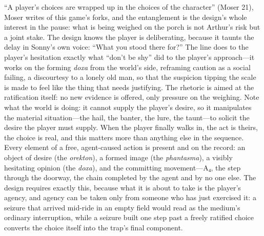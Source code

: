 \documentclass{article}
\begin{document}
``A player's choices are wrapped up in the choices of the character'' (Moser 21), Moser writes of this game's forks, and the entanglement is the design's whole interest in the pause: what is being weighed on the porch is not Arthur's risk but a joint stake. The design knows the player is deliberating, because it taunts the delay in Sonny's own voice: ``What you stood there for?'' The line does to the player's hesitation exactly what ``don't be shy'' did to the player's approach---it works on the forming \textit{doxa} from the world's side, reframing caution as a social failing, a discourtesy to a lonely old man, so that the suspicion tipping the scale is made to feel like the thing that needs justifying. The rhetoric is aimed at the ratification itself: no new evidence is offered, only pressure on the weighing. Note what the world is doing: it cannot supply the player's desire, so it manipulates the material situation---the hail, the banter, the lure, the taunt---to solicit the desire the player must supply. When the player finally walks in, the act is theirs, the choice is real, and this matters more than anything else in the sequence. Every element of a free, agent-caused action is present and on the record: an object of desire (the \textit{orekton}), a formed image (the \textit{phantasma}), a visibly hesitating opinion (the \textit{doxa}), and the committing movement---A₄, the step through the doorway, the chain completed by the agent and by no one else. The design requires exactly this, because what it is about to take is the player's agency, and agency can be taken only from someone who has just exercised it: a seizure that arrived mid-ride in an empty field would read as the medium's ordinary interruption, while a seizure built one step past a freely ratified choice converts the choice itself into the trap's final component.
\end{document}
